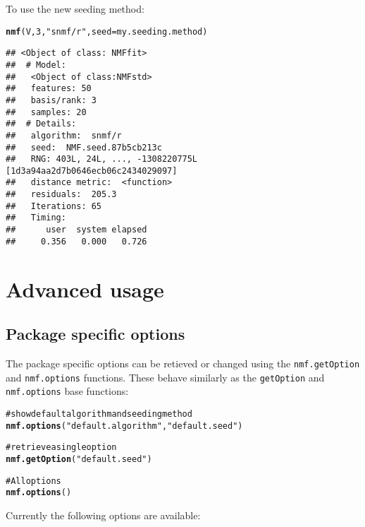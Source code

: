 \documentclass[a4paper]{article}\usepackage{graphicx, color}
\makeatletter
\newcommand{\hlfunctioncall}[1]{\textcolor[rgb]{0.501960784313725,0,0.329411764705882}{\textbf{#1}}}%
\newcommand{\hlstring}[1]{\textcolor[rgb]{0.6,0.6,1}{#1}}%
\newcommand{\hlcomment}[1]{\textcolor[rgb]{0.180392156862745,0.6,0.341176470588235}{#1}}%
\newenvironment{kframe}{%
 \def\at@end@of@kframe{}%
 \ifinner\ifhmode%
  \def\at@end@of@kframe{\end{minipage}}%
  \begin{minipage}{\columnwidth}%
 \fi\fi%
 \def\FrameCommand##1{\hskip\@totalleftmargin \hskip-\fboxsep
 \colorbox{shadecolor}{##1}\hskip-\fboxsep
     \hskip-\linewidth \hskip-\@totalleftmargin \hskip\columnwidth}%
 \MakeFramed {\advance\hsize-\width
   \@totalleftmargin\z@ \linewidth\hsize
   \@setminipage}}%
 {\par\unskip\endMakeFramed%
 \at@end@of@kframe}
\newenvironment{knitrout}{}{} %
\let\code=\texttt
\makeatother
\begin{document}
To use the new seeding method:
\begin{knitrout}
\color{fgcolor}\begin{kframe}
\begin{alltt}
\hlfunctioncall{nmf}(V, 3, \hlstring{"snmf/r"}, seed = my.seeding.method)
\end{alltt}
\begin{verbatim}
## <Object of class: NMFfit>
##  # Model:
##   <Object of class:NMFstd>
##   features: 50 
##   basis/rank: 3 
##   samples: 20 
##  # Details:
##   algorithm:  snmf/r 
##   seed:  NMF.seed.87b5cb213c 
##   RNG: 403L, 24L, ..., -1308220775L [1d3a94aa2d7b0646ecb06c2434029097]
##   distance metric:  <function> 
##   residuals:  205.3 
##   Iterations: 65 
##   Timing:
##      user  system elapsed 
##     0.356   0.000   0.726
\end{verbatim}
\end{kframe}
\end{knitrout}


\section{Advanced usage}

\subsection{Package specific options}
The package specific options can be retieved or changed using the \code{nmf.getOption} and \code{nmf.options} functions. 
These behave similarly as the \code{getOption} and \code{nmf.options} base functions:

\begin{knitrout}
\color{fgcolor}\begin{kframe}
\begin{alltt}
\hlcomment{# show default algorithm and seeding method}
\hlfunctioncall{nmf.options}(\hlstring{"default.algorithm"}, \hlstring{"default.seed"})

\hlcomment{# retrieve a single option}
\hlfunctioncall{nmf.getOption}(\hlstring{"default.seed"})

\hlcomment{# All options}
\hlfunctioncall{nmf.options}()
\end{alltt}
\end{kframe}
\end{knitrout}


Currently the following options are available:
\end{document}
